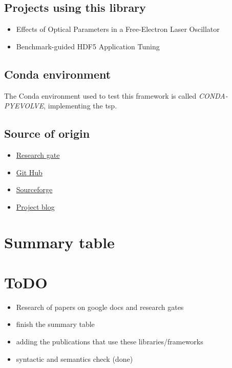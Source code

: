 \documentclass{article}
\begin{document}
	\subsection{Projects using this library}
	\begin{itemize}
		\item Effects of Optical Parameters in a Free-Electron Laser Oscillator
		\item Benchmark-guided HDF5 Application Tuning
	\end{itemize}
	\subsection{Conda environment}
	The Conda environment used to test this framework is called \textit{CONDA-PYEVOLVE}, implementing the tsp.
	\subsection{Source of origin}
	\begin{itemize}
		\item \href{https://www.researchgate.net/publication/285104816_Pyevolve_A_Python_open-source_framework_for_genetic_algorithms}{Research gate}
		\item \href{https://github.com/sjspielman/pyvolve}{Git Hub}
		\item \href{http://pyevolve.sourceforge.net/0_6rc1/index.html}{Sourceforge}
		\item \href{http://blog.christianperone.com/?s=pyevolve}{Project blog}
	\end{itemize}
	
	\section{Summary table}
	
	\section{ToDO}
	\begin{itemize}
		\item Research of papers on google docs and research gates \item finish the summary table
		\item adding the publications that use these libraries/frameworks
		\item syntactic and semantics check (done)
	\end{itemize}
	
\end{document}
